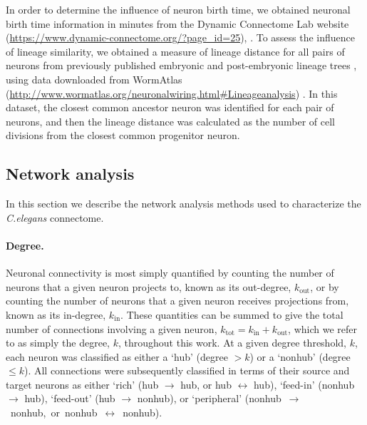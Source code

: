 In order to determine the influence of neuron birth time, we obtained neuronal birth time information in minutes from the Dynamic Connectome Lab website (\url{https://www.dynamic-connectome.org/?page_id=25}), \citep{Varier2011}.
To assess the influence of lineage similarity, we obtained a measure of lineage distance for all pairs of neurons from previously published embryonic and post-embryonic lineage trees \citep{Sulston1977, Sulston1983}, using data downloaded from WormAtlas (\url{http://www.wormatlas.org/neuronalwiring.html#Lineageanalysis}) \citep{WormAtlas}.
In this dataset, the closest common ancestor neuron was identified for each pair of neurons, and then the lineage distance was calculated as the number of cell divisions from the closest common progenitor neuron.

\subsection*{Network analysis}
In this section we describe the network analysis methods used to characterize the \emph{C.elegans} connectome.

\paragraph{Degree.}
Neuronal connectivity is most simply quantified by counting the number of neurons that a given neuron projects to, known as its out-degree, $k_\mathrm{out}$, or by counting the number of neurons that a given neuron receives projections from, known as its in-degree, $k_\mathrm{in}$.
These quantities can be summed to give the total number of connections involving a given neuron, $k_\mathrm{tot} = k_\mathrm{in} + k_\mathrm{out}$, which we refer to as simply the degree, $k$, throughout this work.
At a given degree threshold, $k$, each neuron was classified as either a `hub' (degree $>k$) or a `nonhub' (degree $\leq k$).
All connections were subsequently classified in terms of their source and target neurons as either
`rich' (hub $\rightarrow$ hub, or hub $\leftrightarrow$ hub),
`feed-in' (nonhub $\rightarrow$ hub),
`feed-out' (hub $\rightarrow$ nonhub),
or `peripheral' \mbox{(nonhub $\rightarrow$ nonhub, or nonhub $\leftrightarrow$ nonhub)}.

